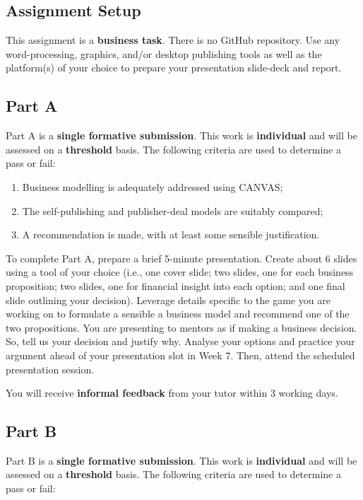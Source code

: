 \documentclass{../../fal_assignment}
\begin{document}
\subsection*{Assignment Setup}

This assignment is a \textbf{business task}. There is no GitHub repository. Use any word-processing, graphics, and/or desktop publishing tools as well as the platform(s) of your choice to prepare your presentation slide-deck and report.

\subsection*{Part A}

Part A is a \textbf{single formative submission}. This work is \textbf{individual} and will be assessed on a \textbf{threshold} basis. The following criteria are used to determine a pass or fail:

\begin{enumerate}[label=(\alph*)]
	\item Business modelling is adequately addressed using CANVAS;
	\item The self-publishing and publisher-deal models are suitably compared;
	\item A recommendation is made, with at least some sensible justification.
\end{enumerate}

To complete Part A, prepare a brief 5-minute presentation. Create about 6 slides using a tool of your choice (i.e., one cover slide; two slides, one for each business proposition; two slides, one for financial insight into each option; and one final slide outlining your decision). Leverage details specific to the game you are working on to formulate a sensible a business model and recommend one of the two propositions. You are presenting to mentors as if making a business decision. So, tell us your decision and justify why. Analyse your options and practice your argument ahead of your presentation slot in Week 7. Then, attend the scheduled presentation session.

You will receive \textbf{informal feedback} from your tutor within 3 working days.

\subsection*{Part B}

Part B is a \textbf{single formative submission}. This work is \textbf{individual} and will be assessed on a \textbf{threshold} basis. The following criteria are used to determine a pass or fail:
\end{document}
